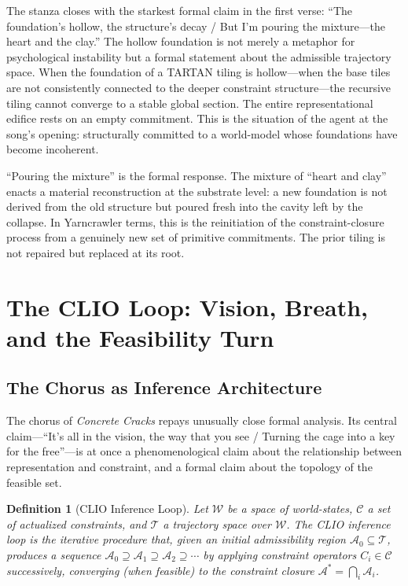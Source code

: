 \documentclass[12pt, a4paper]{article}
\newtheorem{definition}{Definition}
\begin{document}
The stanza closes with the starkest formal claim in the first verse: ``The foundation's hollow, the structure's decay / But I'm pouring the mixture---the heart and the clay.'' The hollow foundation is not merely a metaphor for psychological instability but a formal statement about the admissible trajectory space. When the foundation of a TARTAN tiling is hollow---when the base tiles are not consistently connected to the deeper constraint structure---the recursive tiling cannot converge to a stable global section. The entire representational edifice rests on an empty commitment. This is the situation of the agent at the song's opening: structurally committed to a world-model whose foundations have become incoherent.

``Pouring the mixture'' is the formal response. The mixture of ``heart and clay'' enacts a material reconstruction at the substrate level: a new foundation is not derived from the old structure but poured fresh into the cavity left by the collapse. In Yarncrawler terms, this is the reinitiation of the constraint-closure process from a genuinely new set of primitive commitments. The prior tiling is not repaired but replaced at its root.

\section{The CLIO Loop: Vision, Breath, and the Feasibility Turn}

\subsection{The Chorus as Inference Architecture}

The chorus of \textit{Concrete Cracks} repays unusually close formal analysis. Its central claim---``It's all in the vision, the way that you see / Turning the cage into a key for the free''---is at once a phenomenological claim about the relationship between representation and constraint, and a formal claim about the topology of the feasible set.

\begin{definition}[CLIO Inference Loop]
Let $\mathcal{W}$ be a space of world-states, $\mathcal{C}$ a set of actualized constraints, and $\mathcal{T}$ a trajectory space over $\mathcal{W}$. The CLIO inference loop is the iterative procedure that, given an initial admissibility region $\mathcal{A}_0 \subseteq \mathcal{T}$, produces a sequence $\mathcal{A}_0 \supseteq \mathcal{A}_1 \supseteq \mathcal{A}_2 \supseteq \cdots$ by applying constraint operators $C_i \in \mathcal{C}$ successively, converging (when feasible) to the constraint closure $\mathcal{A}^* = \bigcap_i \mathcal{A}_i$.
\end{definition}
\end{document}
